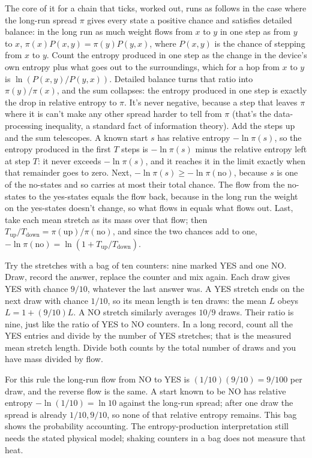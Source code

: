 \documentclass[11pt,twoside]{article}
\theoremstyle{thielethm}
\theoremstyle{thieledef}
\theoremstyle{thieledef}
\theoremstyle{thieledef}
\theoremstyle{thielethm}
\theoremstyle{thieleobs}
\theoremstyle{thielethm}
\begin{document}
The core of it for a chain that ticks, worked out, runs as follows in the case where the long-run spread
$\pi$ gives every state a positive chance and satisfies detailed balance: in the long run as much
weight flows from $x$ to $y$ in one step as from $y$ to $x$, $\pi(x)P(x,y) = \pi(y)P(y,x)$, where
$P(x,y)$ is the chance of stepping from $x$ to $y$. Count the entropy produced in one step as
the change in the device's own entropy plus what goes out to the surroundings, which for a hop
from $x$ to $y$ is $\ln(P(x,y)/P(y,x))$. Detailed balance turns that ratio into
$\pi(y)/\pi(x)$, and the sum collapses: the entropy produced in one step is exactly the drop in
relative entropy to $\pi$. It's never negative, because a step that leaves $\pi$ where it is
can't make any other spread harder to tell from $\pi$ (that's the data-processing inequality, a
standard fact of information theory). Add the steps up and the sum telescopes. A known start $s$
has relative entropy $-\ln\pi(s)$, so the entropy produced in the first $T$ steps is $-\ln\pi(s)$
minus the relative entropy left at step $T$: it never exceeds $-\ln\pi(s)$, and it reaches it in
the limit exactly when that remainder goes to zero. Next, $-\ln\pi(s) \ge -\ln\pi(\mathrm{no})$,
because $s$ is one of the no-states and so carries at most their total chance. The flow from the
no-states to the yes-states equals the flow back, because in the long run the weight on the
yes-states doesn't change, so what flows in equals what flows out. Last, take each mean stretch
as its mass over that flow; then $T_{\mathrm{up}}/T_{\mathrm{down}} =
\pi(\mathrm{up})/\pi(\mathrm{no})$, and since the two chances add to one,
$-\ln\pi(\mathrm{no}) = \ln(1 + T_{\mathrm{up}}/T_{\mathrm{down}})$.

Try the stretches with a bag of ten counters: nine marked YES and one NO. Draw,
record the answer, replace the counter and mix again. Each draw gives YES with chance
$9/10$, whatever the last answer was. A YES stretch ends on the next draw with chance
$1/10$, so its mean length is ten draws: the mean $L$ obeys
$L=1+(9/10)L$. A NO stretch similarly averages $10/9$ draws. Their ratio is nine,
just like the ratio of YES to NO counters. In a long record, count all the YES entries
and divide by the number of YES stretches; that is the measured mean stretch length.
Divide both counts by the total number of draws and you have mass divided by flow.

For this rule the long-run flow from NO to YES is $(1/10)(9/10)=9/100$ per draw,
and the reverse flow is the same. A start known to be NO has relative entropy
$-\ln(1/10)=\ln10$ against the long-run spread; after one draw the spread is already
$1/10,9/10$, so none of that relative entropy remains. This bag shows the probability
accounting. The entropy-production interpretation still needs the stated physical model;
shaking counters in a bag does not measure that heat.
\end{document}
